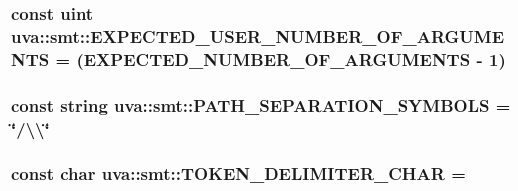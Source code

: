 \subsubsection[{E\+X\+P\+E\+C\+T\+E\+D\+\_\+\+U\+S\+E\+R\+\_\+\+N\+U\+M\+B\+E\+R\+\_\+\+O\+F\+\_\+\+A\+R\+G\+U\+M\+E\+N\+T\+S}]{\setlength{\rightskip}{0pt plus 5cm}const uint uva\+::smt\+::\+E\+X\+P\+E\+C\+T\+E\+D\+\_\+\+U\+S\+E\+R\+\_\+\+N\+U\+M\+B\+E\+R\+\_\+\+O\+F\+\_\+\+A\+R\+G\+U\+M\+E\+N\+T\+S = ({\bf E\+X\+P\+E\+C\+T\+E\+D\+\_\+\+N\+U\+M\+B\+E\+R\+\_\+\+O\+F\+\_\+\+A\+R\+G\+U\+M\+E\+N\+T\+S} -\/ 1)}\label{namespaceuva_1_1smt_a3e6faa2f4ff7b75ea9e1d8eca32c45bd}
\hypertarget{namespaceuva_1_1smt_afb9a44bd9eb3ded951a6f0c41f07c108}{}
\subsubsection[{P\+A\+T\+H\+\_\+\+S\+E\+P\+A\+R\+A\+T\+I\+O\+N\+\_\+\+S\+Y\+M\+B\+O\+L\+S}]{\setlength{\rightskip}{0pt plus 5cm}const string uva\+::smt\+::\+P\+A\+T\+H\+\_\+\+S\+E\+P\+A\+R\+A\+T\+I\+O\+N\+\_\+\+S\+Y\+M\+B\+O\+L\+S = \char`\"{}/\textbackslash{}\textbackslash{}\char`\"{}}\label{namespaceuva_1_1smt_afb9a44bd9eb3ded951a6f0c41f07c108}
\hypertarget{namespaceuva_1_1smt_a83e439b9599a06adad4132cbfa40e4e3}{}
\subsubsection[{T\+O\+K\+E\+N\+\_\+\+D\+E\+L\+I\+M\+I\+T\+E\+R\+\_\+\+C\+H\+A\+R}]{\setlength{\rightskip}{0pt plus 5cm}const char uva\+::smt\+::\+T\+O\+K\+E\+N\+\_\+\+D\+E\+L\+I\+M\+I\+T\+E\+R\+\_\+\+C\+H\+A\+R = \textquotesingle{} \textquotesingle{}}\label{namespaceuva_1_1smt_a83e439b9599a06adad4132cbfa40e4e3}
